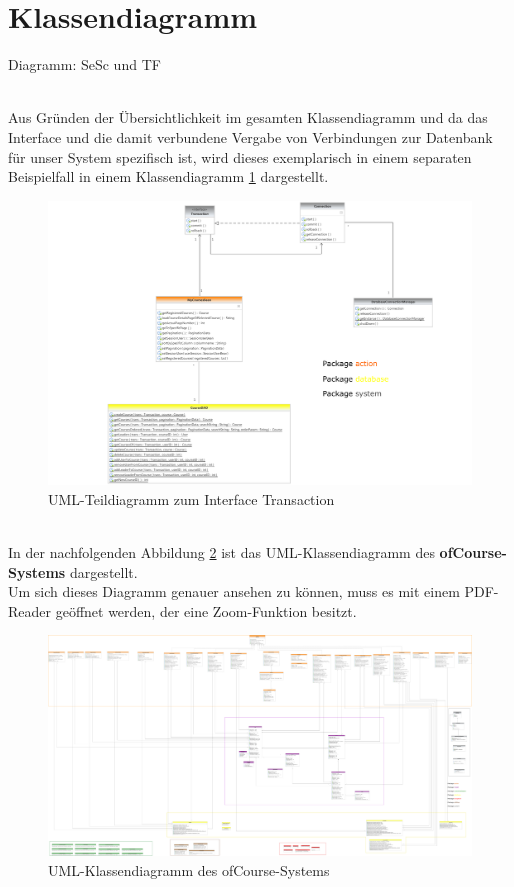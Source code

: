 	
	\section{Klassendiagramm}
	\begin{tiny}
		Diagramm: SeSc und TF\\
	\end{tiny}\\
	Aus Gründen der Übersichtlichkeit im gesamten Klassendiagramm und da das Interface  und die damit verbundene Vergabe von Verbindungen zur Datenbank für unser System spezifisch ist, wird dieses exemplarisch in einem separaten Beispielfall in einem Klassendiagramm \ref{fig:Teildiagramm} dargestellt.
	\begin{figure}[h]
	\centering
	\includegraphics[width=1\linewidth]{Grafiken/Teildiagramm}
	\caption{UML-Teildiagramm zum Interface Transaction}
	\label{fig:Teildiagramm}
	\end{figure}
	\ \\
	In der nachfolgenden Abbildung \ref{fig:UMLKlassendiagrammOhneTransaction_ink} ist das UML-Klassendiagramm des \textbf{ofCourse-Systems} dargestellt.\\
	Um sich dieses Diagramm genauer ansehen zu können, muss es mit einem PDF-Reader
	geöffnet werden, der eine Zoom-Funktion besitzt.
	
	\begin{figure}[h]
	\centering
	\includegraphics[width=1\linewidth, angle=90]{Grafiken/UMLKlassendiagrammOhneTransaction_ink}
	\caption{UML-Klassendiagramm des ofCourse-Systems}
	\label{fig:UMLKlassendiagrammOhneTransaction_ink}
	\end{figure}
	
